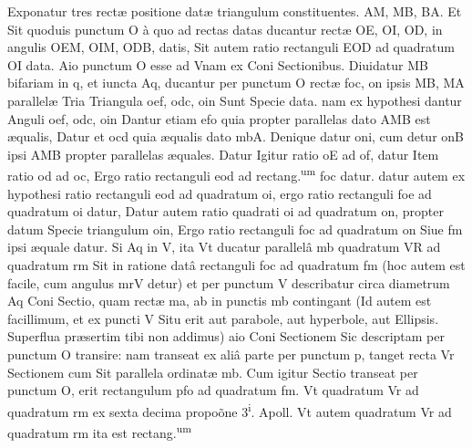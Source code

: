 \documentclass[11pt,a4paper]{article}
\begin{document}
Exponatur tres rectæ positione datæ triangulum constituentes. AM, MB, BA. Et Sit quoduis punctum O à quo ad rectas datas ducantur rectæ OE, OI, OD, in angulis OEM, OIM, ODB, datis, Sit autem ratio rectanguli EOD ad quadratum OI data. Aio punctum O esse ad Vnam ex Coni Sectionibus. Diuidatur MB bifariam in q, et iuncta Aq, ducantur per punctum O rectæ foc, on ipsis MB, MA parallelæ Tria Triangula oef, odc, oin Sunt Specie data. nam ex hypothesi dantur Anguli oef, odc, oin Dantur etiam efo quia propter parallelas dato AMB est æqualis, Datur et ocd quia æqualis dato mbA. Denique datur oni, cum detur onB ipsi AMB propter parallelas æquales. Datur Igitur ratio oE ad of, datur Item ratio od ad oc, Ergo ratio rectanguli eod ad rectang.\textsuperscript{um} foc datur. datur autem ex hypothesi ratio rectanguli eod ad quadratum oi, ergo ratio rectanguli foe ad quadratum oi datur, Datur autem ratio quadrati oi ad quadratum on, propter datum \struck{\ill{}} Specie triangulum oin, Ergo ratio rectanguli foc ad quadratum on Siue fm ipsi æquale datur. Si  Aq in V, ita Vt ducatur parallelâ mb quadratum VR ad quadratum rm Sit in ratione datâ rectanguli foc ad quadratum fm (hoc autem est facile, cum angulus mrV detur) et per punctum V describatur circa diametrum Aq Coni Sectio, quam rectæ ma, ab in punctis mb contingant (Id autem est facillimum, et ex puncti V Situ erit aut parabole, aut hyperbole, aut Ellipsis. Superflua præsertim tibi non addimus) aio Coni Sectionem Sic descriptam per punctum O transire: nam transeat ex aliâ parte per punctum p, tanget recta Vr Sectionem cum Sit parallela ordinatæ mb. Cum igitur Sectio transeat per punctum O, erit rectangulum pfo ad quadratum fm. Vt quadratum Vr ad quadratum rm  ex sexta decima propoõne 3\textsuperscript{i}. Apoll. Vt autem quadratum Vr ad quadratum rm ita est rectang.\textsuperscript{um}
\end{document}
